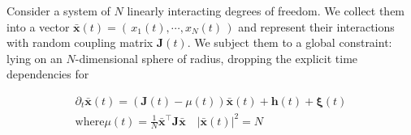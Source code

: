 Consider a system of $N$ linearly interacting degrees of freedom. We collect them into a vector $\mathbf{\bar x}(t) = \left(\,x_1(t),\cdots, x_N(t)\,\right)$ and represent their interactions with random coupling matrix $\mathbf{J}(t)$. We subject them to a global constraint: lying on an $N$-dimensional sphere of radius, dropping the explicit time dependencies for 

\begin{align}
\partial_t\mathbf{\bar x}(t) = (\mathbf{J}(t)-\mu(t))\mathbf{\bar x}(t)+\mathbf{h}(t)+\boldsymbol\xi(t) \\
\mathrm{where}\mu(t)=\frac{1}{N}\mathbf{\bar x}^{\top}\mathbf{J}\mathbf{\bar x}\quad|\mathbf{\bar x}(t)|^2=N
\end{align}